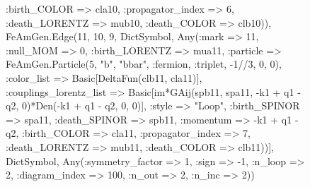 \documentclass{revtex4}
\begin{document}
\begin{figure}[!htb]
\begin{center}
{:birth_COLOR => cla10, :propagator_index => 6, :death_LORENTZ => mub10, :death_COLOR => clb10)), FeAmGen.Edge(11, 10, 9, Dict{Symbol, Any}(:mark => 11, :null_MOM => 0, :birth_LORENTZ => mua11, :particle => FeAmGen.Particle(5, "b", "bbar", :fermion, :triplet, -1//3, 0, 0), :color_list => Basic[DeltaFun(clb11, cla11)], :couplings_lorentz_list => Basic[im*GAij(spb11, spa11, -k1 + q1 - q2, 0)*Den(-k1 + q1 - q2, 0, 0)], :style => "Loop", :birth_SPINOR => spa11, :death_SPINOR => spb11, :momentum => -k1 + q1 - q2, :birth_COLOR => cla11, :propagator_index => 7, :death_LORENTZ => mub11, :death_COLOR => clb11))], Dict{Symbol, Any}(:symmetry_factor => 1, :sign => -1, :n_loop => 2, :diagram_index => 100, :n_out => 2, :n_inc => 2)) 
}
\end{center}
\end{figure}
\end{document}
